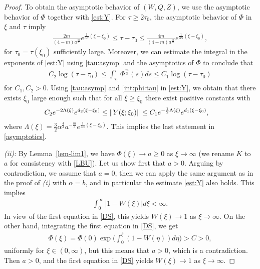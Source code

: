 \documentclass{article}%
\newcommand{\alp}{\alpha}
\begin{document}
\begin{proof}
To obtain the asymptotic behavior of $(W,Q,Z)$, we use the asymptotic behavior 
of $\Phi$ together with \eqref{est:Y}.  For $\tau\geq 2\tau_0$, the asymptotic
 behavior of $\Phi$ in $\xi$ and $\tau$ imply 
\begin{align}\label{tau:asymp}
  \frac{2 m}{(4-m)a^{\frac{m}{3}}} e^{\frac{1}{3\alp}(\xi-\xi_0)} \leq \tau-\tau_0 \leq
  \frac{4 m}{(4-m)a^{\frac{m}{3}}} e^{\frac{1}{3\alp}(\xi-\xi_0)},
\end{align}
for $\tau_0 = \tau(\xi_0)$ sufficiently large. Moreover, we can estimate the integral 
in the exponents of \eqref{est:Y} using \eqref{tau:asymp} and the asymptotics 
of $\Phi$ to conclude that
\begin{align}\label{int:phi:tau} %
    C_2 \log(\tau-\tau_0) \leq \int_{\tau_0}^\tau\Phi^{\frac{m}{3}}(s)ds \leq C_1 \log(\tau-\tau_0)
\end{align}
  for $C_1,C_2 > 0$. Using \eqref{tau:asymp} and \eqref{int:phi:tau}
  in \eqref{est:Y}, we obtain that there exists $\xi_0$ large enough such
  that for all $\xi\geq \xi_0$ there exist positive constants with
\begin{align*}
    \hspace{6ex} & \hspace{-6ex} %
                   C_2 e^{- 2\Lambda(\xi)}e^{d_2(\xi-\xi_0)} \leq \| Y(\xi;\xi_0)\| %
    \leq C_1 e^{- \frac 12 \Lambda(\xi)} e^{ d_1(\xi-\xi_0)},
\end{align*}
where $\Lambda(\xi) = \frac 32 \alp^{\frac{4}{3}} a^{-\frac{m}{3}} e^{\frac{1}{3\alp}(\xi-\xi_0)}$. 
This implies the last statement in \eqref{asymptotics}.

  \medskip

{\it (ii):} By Lemma~\ref{lem-lim1}, we have $\Phi(\xi) \to a \geq 0$ as $\xi \to \infty$
 (we rename $K$ to $a$ for consistency with \eqref{LBU}). Let us show first that $a>0$. 
Arguing by contradiction, we assume that $a=0$, then we can apply the same argument as
 in the proof of {\it (i)} with $\alp=b$, and in particular the estimate \eqref{est:Y} also holds. 
This implies
    \begin{align}
      \int_0^\infty |1-W(\xi)| d\xi < \infty.
    \end{align}
    In view of the first equation in \eqref{DS}, this yields $W(\xi)\to 1$ as
    $\xi\to \infty$.  On the other hand, integrating the first equation in
    \eqref{DS}, we get
    \begin{align}
      \Phi(\xi) = \Phi(0) \exp \Big( \int_0^\xi (1- W(\eta)) d\eta \Big) %
      > C > 0,
    \end{align}
    uniformly for $\xi \in (0,\infty)$, but this means that $a > 0$, which is
 a contradiction. Then $a>0$, and the first equation in \eqref{DS}
yields $W(\xi) \to 1$ as $\xi \to \infty$.


\end{proof}
\end{document}
